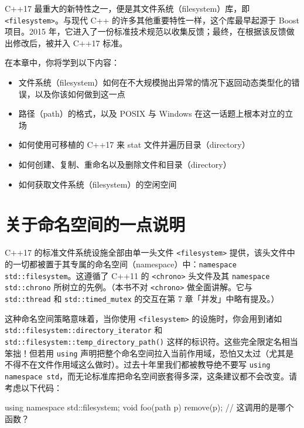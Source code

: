 C++17 最重大的新特性之一，便是其文件系统（filesystem）库，即 \texttt{<filesystem>\allowbreak{}}。与现代 C++ 的许多其他重要特性一样，这个库最早起源于 Boost 项目。2015 年，它进入了一份标准技术规范以收集反馈；最终，在根据该反馈做出修改后，被并入 C++17 标准。

在本章中，你将学到以下内容：

\begin{itemize}
\item 文件系统（filesystem）如何在不大规模抛出异常的情况下返回动态类型化的错误，以及你该如何做到这一点
\item 路径（path）的格式，以及 POSIX 与 Windows 在这一话题上根本对立的立场
\item 如何使用可移植的 C++17 来 stat 文件并遍历目录（directory）
\item 如何创建、复制、重命名以及删除文件和目录（directory）
\item 如何获取文件系统（filesystem）的空闲空间
\end{itemize}

\section{关于命名空间的一点说明}

C++17 的标准文件系统设施全部由单一头文件 \texttt{<filesystem>\allowbreak{}} 提供，该头文件中的一切都被置于其专属的命名空间（namespace）中：\texttt{namespace std::\allowbreak{}filesystem}。这遵循了 C++11 的 \texttt{<chrono>\allowbreak{}} 头文件及其 \texttt{namespace std::\allowbreak{}chrono} 所树立的先例。（本书不对 \texttt{<chrono>\allowbreak{}} 做全面讲解。它与 \texttt{std::\allowbreak{}thread} 和 \texttt{std::\allowbreak{}timed\_\allowbreak{}mutex} 的交互在第 7 章「并发」中略有提及。）

这种命名空间策略意味着，当你使用 \texttt{<filesystem>\allowbreak{}} 的设施时，你会用到诸如 \texttt{std::\allowbreak{}filesystem::\allowbreak{}directory\_\allowbreak{}iterator} 和 \texttt{std::\allowbreak{}filesystem::\allowbreak{}temp\_\allowbreak{}directory\_\allowbreak{}path(\allowbreak{})\allowbreak{}} 这样的标识符。这些完全限定名相当笨拙！但若用 \texttt{using} 声明把整个命名空间拉入当前作用域，恐怕又太过（尤其是不得不在文件作用域这么做时）。过去十年里我们都被教导绝不要写 \texttt{using namespace std}，而无论标准库把命名空间嵌套得多深，这条建议都不会改变。请考虑以下代码：

\begin{codebox}[cpp]
    using namespace std::filesystem;
    void foo(path p)
    {
      remove(p); // 这调用的是哪个函数？
    }
\end{codebox}

